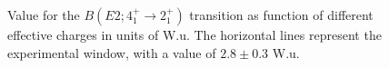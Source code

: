 \begin{figure}
\caption{Value for the $B(E2;4_1^+\rightarrow 2_1^+)$ transition as function of
         different effective charges in units of W.u. The horizontal
         lines represent the experimental window, with a value of 
         $2.8 \pm 0.3$ W.u.}
\label{fig:empe2}
\end{figure}























                           












